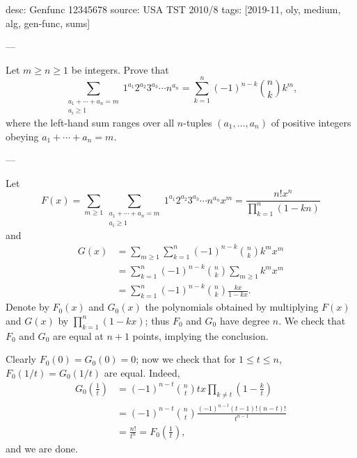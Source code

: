 desc: Genfunc 12345678
source: USA TST 2010/8
tags: [2019-11, oly, medium, alg, gen-func, sums]

---

Let $m\ge n\ge1$ be integers. Prove that \[\sum_{\substack{a_1+\cdots+a_n=m\\ a_i\ge1}}1^{a_1}2^{a_2}3^{a_3}\cdots n^{a_n}=\sum_{k=1}^n(-1)^{n-k}\binom nkk^m,\]
where the left-hand sum ranges over all $n$-tuples $(a_1,\ldots,a_n)$ of positive integers obeying $a_1+\cdots+a_n=m$.

---

Let \[F(x)=\sum_{m\ge1}\sum_{\substack{a_1+\cdots+a_n=m\\ a_i\ge1}}1^{a_1}2^{a_2}3^{a_3}\cdots n^{a_n}x^m=\frac{n!x^n}{\prod_{k=1}^n(1-kn)}\]
and
\begin{align*}
    G(x)&=\sum_{m\ge1}\sum_{k=1}^n(-1)^{n-k}\binom nkk^mx^m\\
    &=\sum_{k=1}^n(-1)^{n-k}\binom nk\sum_{m\ge1}k^mx^m\\
    &=\sum_{k=1}^n(-1)^{n-k}\binom nk\frac{kx}{1-kx}.
\end{align*}
Denote by $F_0(x)$ and $G_0(x)$ the polynomials obtained by multiplying $F(x)$ and $G(x)$ by $\prod_{k=1}^n(1-kx)$; thus $F_0$ and $G_0$ have degree $n$. We check that $F_0$ and $G_0$ are equal at $n+1$ points, implying the conclusion.

Clearly $F_0(0)=G_0(0)=0$; now we check that for $1\le t\le n$, $F_0(1/t)=G_0(1/t)$ are equal. Indeed,
\begin{align*}
    G_0\left(\frac1t\right)&=(-1)^{n-t}\binom nttx\prod_{k\ne t}\left(1-\frac kt\right)\\
    &=(-1)^{n-t}\binom nt\frac{(-1)^{n-t}(t-1)!(n-t)!}{t^{n-1}}\\
    &=\frac{n!}{t^n}=F_0\left(\frac1t\right),
\end{align*}
and we are done.
